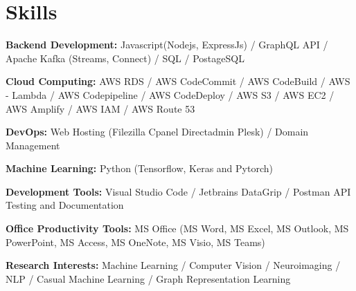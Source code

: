 \documentclass[letterpaper,11pt]{article}
\newcommand{\resumeSubHeadingListStart}{\begin{itemize}[leftmargin=0.15in, label={}]}
\newcommand{\resumeSubHeadingListEnd}{\end{itemize}}
\begin{document}
\section{Skills}
\vspace{2pt}
\resumeSubHeadingListStart
\small{\item{
		\textbf{Backend Development: }{Javascript(Nodejs, ExpressJs) / GraphQL API / Apache Kafka (Streams, Connect) / SQL / PostageSQL} \\ \vspace{3pt}
		
		\textbf{Cloud Computing: }{AWS RDS / AWS CodeCommit / AWS CodeBuild / AWS - Lambda / AWS Codepipeline / AWS CodeDeploy / AWS S3 /
			AWS EC2 / AWS Amplify / AWS IAM / AWS Route 53} \\ \vspace{3pt}
		
		\textbf{DevOps:}{ Web Hosting (Filezilla Cpanel Directadmin Plesk) / Domain Management} \\ 
		
		
		\vspace{3pt}
		
		\textbf{Machine Learning: }{ Python (Tensorflow, Keras and Pytorch)} \\ 
		
		\vspace{3pt}
		
		\textbf{Development Tools: }{ Visual Studio Code / Jetbrains DataGrip / Postman API Testing and Documentation} \\ 
		
		\vspace{3pt}
		
		\textbf{Office Productivity Tools: }{ MS Office (MS Word, MS Excel, MS Outlook, MS PowerPoint, MS Access, MS OneNote, MS Visio, MS Teams)} \\ 
		
		\vspace{3pt}
		
		\textbf{Research Interests:}{ Machine Learning / Computer Vision / Neuroimaging / NLP / Casual Machine Learning / Graph Representation Learning}
		
}}
\resumeSubHeadingListEnd
\end{document}
